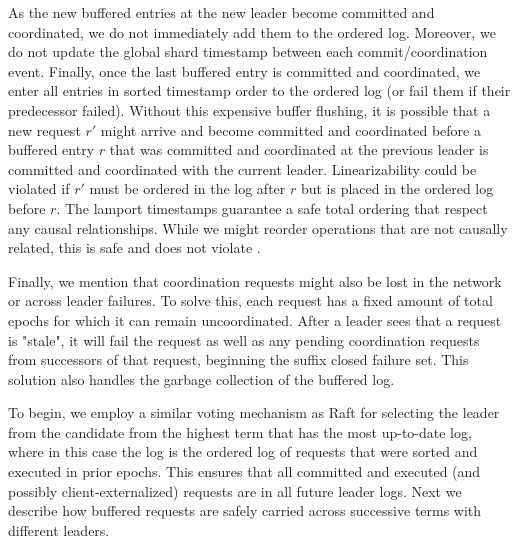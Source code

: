 
As the new buffered entries at the new leader become committed and coordinated, we do not immediately add them to the ordered log. Moreover, we do not update the global shard timestamp between each commit/coordination event. Finally, once the last buffered entry is committed and coordinated, we enter all entries in sorted timestamp order to the ordered log (or fail them if their predecessor failed). Without this expensive buffer flushing, it is possible that a new request $r'$ might arrive and become committed and coordinated before a buffered entry $r$ that was committed and coordinated at the previous leader is committed and coordinated with the current leader. Linearizability could be violated if $r'$ must be ordered in the log after $r$ but is placed in the ordered log before $r$. The lamport timestamps guarantee a safe total ordering that respect any causal relationships. While we might reorder operations that are not causally related, this is safe and does not violate \mdl. 

Finally, we mention that coordination requests might also be lost in the network or across leader failures. To solve this, each request has a fixed amount of total epochs for which it can remain uncoordinated. After a leader sees that a request is "stale", it will fail the request as well as any pending coordination requests from successors of that request, beginning the suffix closed failure set. This solution also handles the garbage collection of the buffered log.







To begin, we employ a similar voting mechanism as Raft for selecting the leader from the candidate from the highest term that has the most up-to-date log, where in this case the log is the ordered log of requests that were sorted and executed in prior epochs. This ensures that all committed and executed (and possibly client-externalized) requests are in all future leader logs. Next we describe how buffered requests are safely carried across successive terms with different leaders.


